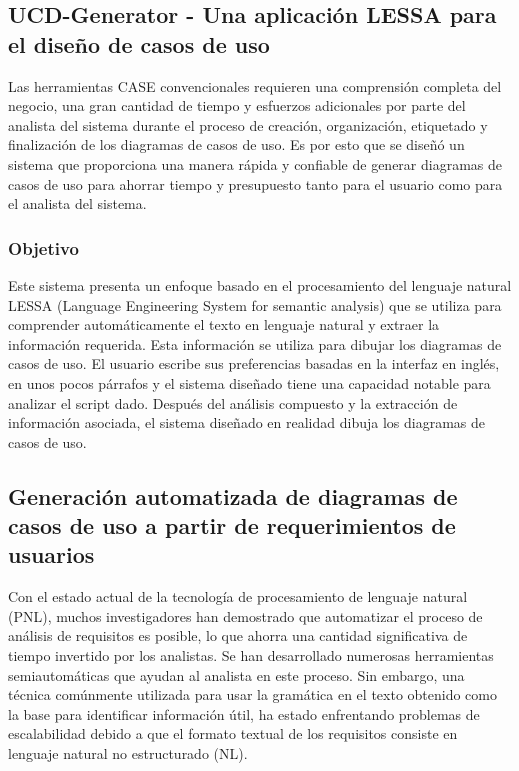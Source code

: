\subsection{UCD-Generator - Una aplicación LESSA para el diseño de casos de uso}

Las herramientas CASE convencionales requieren una comprensión completa del negocio, una gran cantidad de tiempo y esfuerzos adicionales por parte del analista del sistema durante el proceso de creación, organización, etiquetado y finalización de los diagramas de casos de uso. Es por esto que se diseñó un sistema que proporciona una manera rápida y confiable de generar diagramas de casos de uso para ahorrar tiempo y presupuesto tanto para el usuario como para el analista del sistema.

\subsubsection{Objetivo}
Este sistema presenta un enfoque basado en el procesamiento del lenguaje natural LESSA (Language Engineering System for semantic analysis) que se utiliza para comprender automáticamente el texto en lenguaje natural y extraer la información requerida. Esta información se utiliza para dibujar los diagramas de casos de uso. El usuario escribe sus preferencias basadas en la interfaz en inglés, en unos pocos párrafos y el sistema diseñado tiene una capacidad notable para analizar el script dado. Después del análisis compuesto y la extracción de información asociada, el sistema diseñado en realidad dibuja los diagramas de casos de uso. 

\subsection{Generación automatizada de diagramas de casos de uso a partir de requerimientos de usuarios}

Con el estado actual de la tecnología de procesamiento de lenguaje natural (PNL), muchos investigadores han demostrado que automatizar el proceso de análisis de requisitos es posible, lo que ahorra una cantidad significativa de tiempo invertido por los analistas. Se han desarrollado numerosas herramientas semiautomáticas que ayudan al analista en este proceso. Sin embargo, una técnica comúnmente utilizada para usar la gramática en el texto obtenido como la base para identificar información útil, ha estado enfrentando problemas de escalabilidad debido a que el formato textual de los requisitos consiste en lenguaje natural no estructurado (NL). 

